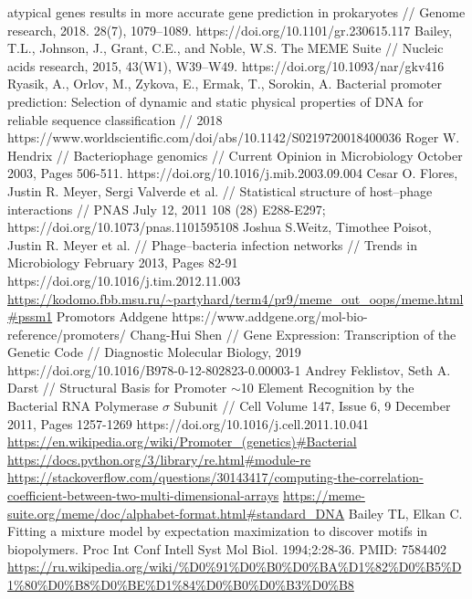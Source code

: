\documentclass[14pt]{extarticle}
\begin{document}
\begin{thebibliography}{9}
    atypical genes results in more accurate gene prediction in prokaryotes // Genome research,  2018. 28(7), 1079–1089.
    https://doi.org/10.1101/gr.230615.117
     Bailey, T.L., Johnson, J., Grant, C.E., and Noble, W.S. The MEME Suite // Nucleic acids research,
    2015, 43(W1), W39–W49. https://doi.org/10.1093/nar/gkv416
     Ryasik, A., Orlov, M., Zykova, E., Ermak, T., Sorokin, A. Bacterial promoter prediction: Selection
    of dynamic and static physical properties of DNA for reliable sequence classification // 2018
    https://www.worldscientific.com/doi/abs/10.1142/S0219720018400036
     Roger W. Hendrix // Bacteriophage genomics // Current Opinion in Microbiology October 2003, Pages
    506-511. https://doi.org/10.1016/j.mib.2003.09.004
     Cesar O. Flores, Justin R. Meyer, Sergi Valverde et al. // Statistical structure of host–phage 
    interactions // PNAS July 12, 2011 108 (28) E288-E297; https://doi.org/10.1073/pnas.1101595108 
     Joshua S.Weitz, Timothee Poisot, Justin R. Meyer et al. // Phage–bacteria infection networks // 
    Trends in Microbiology February 2013, Pages 82-91 https://doi.org/10.1016/j.tim.2012.11.003
     \url{https://kodomo.fbb.msu.ru/~partyhard/term4/pr9/meme_out_oops/meme.html#pssm1}
     Promotors Addgene https://www.addgene.org/mol-bio-reference/promoters/
     Chang-Hui Shen // Gene Expression: Transcription of the Genetic Code // Diagnostic Molecular 
    Biology, 2019 https://doi.org/10.1016/B978-0-12-802823-0.00003-1
     Andrey Feklistov,  Seth A. Darst // Structural Basis for Promoter $\sim$10 Element Recognition by the 
    Bacterial RNA Polymerase $\sigma$ Subunit // Cell Volume 147, Issue 6, 9 December 2011, Pages 1257-1269 
    https://doi.org/10.1016/j.cell.2011.10.041
     \url{https://en.wikipedia.org/wiki/Promoter_(genetics)#Bacterial}
     \url{https://docs.python.org/3/library/re.html#module-re}
     \url{https://stackoverflow.com/questions/30143417/computing-the-correlation-coefficient-between-two-multi-dimensional-arrays}
     \url{https://meme-suite.org/meme/doc/alphabet-format.html#standard_DNA}
     Bailey TL, Elkan C. Fitting a mixture model by expectation maximization to discover motifs in 
    biopolymers. Proc Int Conf Intell Syst Mol Biol. 1994;2:28-36. PMID: 7584402
     \url{https://ru.wikipedia.org/wiki/%D0%91%D0%B0%D0%BA%D1%82%D0%B5%D1%80%D0%B8%D0%BE%D1%84%D0%B0%D0%B3%D0%B8}

\end{thebibliography}
\end{document}
